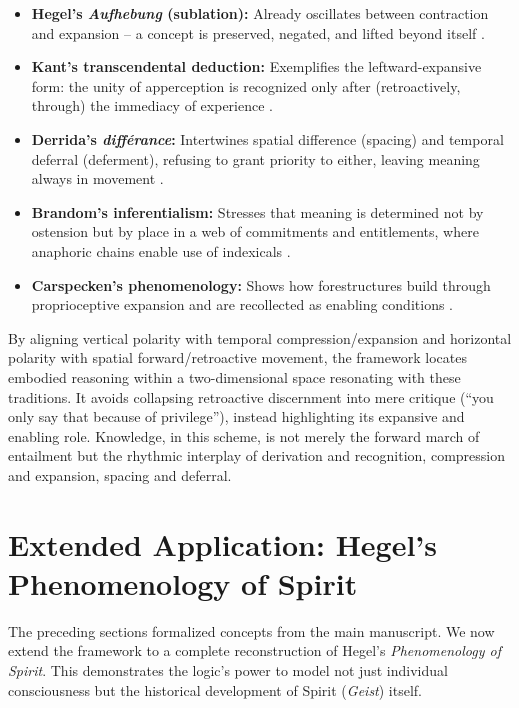 \documentclass[12pt]{book}
\begin{document}
\begin{itemize}
\item \textbf{Hegel's \textit{Aufhebung} (sublation):} Already oscillates between contraction and expansion -- a concept is preserved, negated, and lifted beyond itself \parencite{hegel1977phenomenology}.

\item \textbf{Kant's transcendental deduction:} Exemplifies the leftward-expansive form: the unity of apperception is recognized only after (retroactively, through) the immediacy of experience \parencite{Kant1781}.

\item \textbf{Derrida's \textit{différance}:} Intertwines spatial difference (spacing) and temporal deferral (deferment), refusing to grant priority to either, leaving meaning always in movement \parencite{Derrida:1973}.

\item \textbf{Brandom's inferentialism:} Stresses that meaning is determined not by ostension but by place in a web of commitments and entitlements, where anaphoric chains enable use of indexicals \parencite{brandom1994making,Brandom2008}.

\item \textbf{Carspecken's phenomenology:} Shows how forestructures build through proprioceptive expansion and are recollected as enabling conditions \parencite{Carspecken1999}.
\end{itemize}

By aligning vertical polarity with temporal compression/expansion and horizontal polarity with spatial forward/retroactive movement, the framework locates embodied reasoning within a two-dimensional space resonating with these traditions. It avoids collapsing retroactive discernment into mere critique (``you only say that because of privilege''), instead highlighting its expansive and enabling role. Knowledge, in this scheme, is not merely the forward march of entailment but the rhythmic interplay of derivation and recognition, compression and expansion, spacing and deferral.

\section{Extended Application: Hegel's Phenomenology of Spirit}

The preceding sections formalized concepts from the main manuscript. We now extend the framework to a complete reconstruction of Hegel's \emph{Phenomenology of Spirit}. This demonstrates the logic's power to model not just individual consciousness but the historical development of Spirit (\emph{Geist}) itself.
\end{document}
